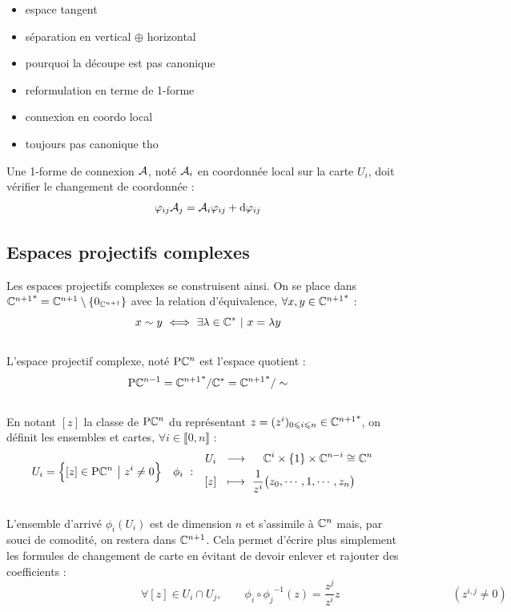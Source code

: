 \begin{itemize}
	\item espace tangent 
	
	\item séparation en vertical $\oplus$ horizontal
	
	\item pourquoi la découpe est pas canonique
	
	\item reformulation en terme de 1-forme
	
	\item connexion en coordo local
	
	\item toujours pas canonique tho
	
	
\end{itemize}
\begin{proposition}
	Une 1-forme de connexion $\mathcal{A} $, noté $\mathcal{A}_i$ en coordonnée local sur la carte $U_i$, doit vérifier le changement de coordonnée :
	\[\varphi_{ij}\mathcal{A}_j = \mathcal{A}_i \varphi_{ij} + \text{\normalfont d} \varphi_{ij}\]
\end{proposition}




\subsection{Espaces projectifs complexes}

Les espaces projectifs complexes se construisent ainsi. On se place dans ${\mathbb{C}^{n+1}}^*=\mathbb{C}^{n+1}\setminus\{0_{\mathbb{C}^{n+1}}\}$ avec la relation d'équivalence, $\forall x,y\in{\mathbb{C}^{n+1}}^*$ :
\[x \sim y\ \Llr\ \exists \lambda\in\C^*\ |\ x=\lambda y\]
\\
L'espace projectif complexe, noté $\text{\normalfont P}\mathbb{C}^{n}$ est l'espace quotient :
\[\text{\normalfont P}\mathbb{C}^{n-1} = {\mathbb{C}^{n+1}}^*/\mathbb{C}^* = {\mathbb{C}^{n+1}}^*/\sim\]
\\
En notant $[z]$ la classe de $\text{\normalfont P}\mathbb{C}^{n}$ du représentant $z = (z^i)_{0\leqslant i\leqslant n}\in{\mathbb{C}^{n+1}}^*$, on définit les ensembles et cartes, $\forall i\in\llbracket0,n\rrbracket$ :
\begin{align}
	U_i &= \Big\{[z]\in\text{\normalfont P}\mathbb{C}^{n}\ \big|\ z^i\neq 0\Big\}  &  \phi_i\  :\quad &\begin{aligned}
		U_i\ \ &\longrightarrow\quad\ \mathbb{C}^{i}\times \{1\} \times\mathbb{C}^{n-i}\cong \mathbb{C}^{n} \\ [z]\ \ &\longmapsto\ \frac{1}{z^i}\big(z_0,\cdots, 1,\cdots, z_n\big)
	\end{aligned}
\end{align}
\\
L'ensemble d'arrivé $\phi_i(U_i)$ est de dimension $n$ et s'assimile à $\mathbb{C}^{n}$ mais, par souci de comodité, on restera dans $\mathbb{C}^{n+1}$. Cela permet  d'écrire plus simplement les formules de changement de carte en évitant de devoir enlever et rajouter des coefficients :
\[\qquad\qquad\qquad\qquad\qquad\qquad \forall [z]\in U_i\cap U_j,\qquad \phi_i \circ {\phi_j}^{-1}(z) = \frac{z^j}{z^i}z\qquad\qquad\qquad\qquad\qquad (z^{i,j}\neq 0) \qquad\]

